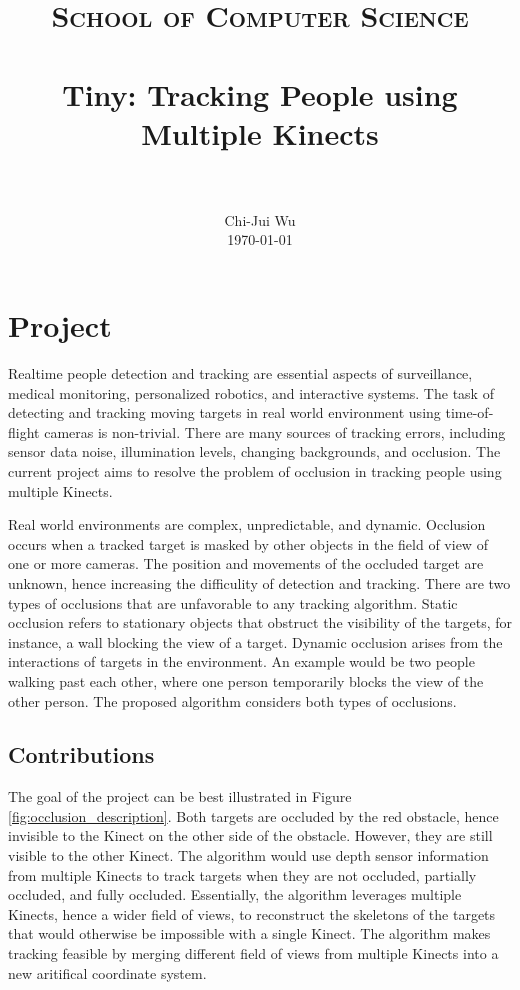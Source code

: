 \documentclass[paper=a4, fontsize=11pt]{scrartcl}
\title{
		\vspace{-3ex}
		\usefont{OT1}{bch}{b}{n}
		\normalfont \normalsize \textsc{School of Computer Science} \\ [25pt]
		\horrule{0.5pt} \\[0.4cm]
		\huge Tiny: Tracking People using Multiple Kinects \\
		\horrule{2pt} \\[0.5cm]
		\vspace{-2ex}
}
\author{
		\normalfont 								\normalsize
        Chi-Jui Wu\\[-3pt]		\normalsize
        \today
}
\date{}
\numberwithin{equation}{section}		%
\numberwithin{figure}{section}			%
\numberwithin{table}{section}				%
\begin{document}
\maketitle

\section{Project}

Realtime people detection and tracking are essential aspects of surveillance, medical monitoring, personalized robotics, and interactive systems. The task of detecting and tracking moving targets in real world environment using time-of-flight cameras is non-trivial. There are many sources of tracking errors, including sensor data noise, illumination levels, changing backgrounds, and occlusion. The current project aims to resolve the problem of occlusion in tracking people using multiple Kinects.

Real world environments are complex, unpredictable, and dynamic. Occlusion occurs when a tracked target is masked by other objects in the field of view of one or more cameras. The position and movements of the occluded target are unknown, hence increasing the difficulity of detection and tracking. There are two types of occlusions that are unfavorable to any tracking algorithm. Static occlusion refers to stationary objects that obstruct the visibility of the targets, for instance, a wall blocking the view of a target. Dynamic occlusion arises from the interactions of targets in the environment. An example would be two people walking past each other, where one person temporarily blocks the view of the other person. The proposed algorithm considers both types of occlusions.

\subsection{Contributions}

The goal of the project can be best illustrated in Figure \ref{fig:occlusion_description}. Both targets are occluded by the red obstacle, hence invisible to the Kinect on the other side of the obstacle. However, they are still visible to the other Kinect. The algorithm would use depth sensor information from multiple Kinects to track targets when they are not occluded, partially occluded, and fully occluded. Essentially, the algorithm leverages multiple Kinects, hence a wider field of views, to reconstruct the skeletons of the targets that would otherwise be impossible with a single Kinect. The algorithm makes tracking feasible by merging different field of views from multiple Kinects into a new aritifical coordinate system.
\end{document}
